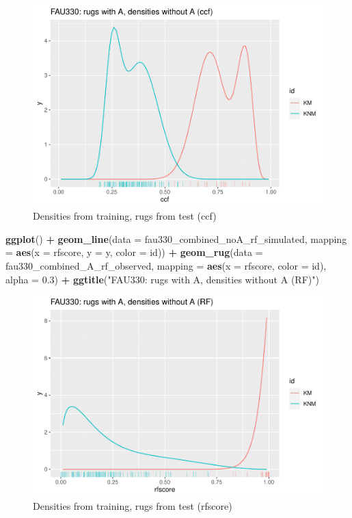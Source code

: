 \documentclass[]{elsarticle} %
\newenvironment{Shaded}{\begin{snugshade}}{\end{snugshade}}
\newcommand{\DataTypeTok}[1]{\textcolor[rgb]{0.13,0.29,0.53}{#1}}
\newcommand{\FloatTok}[1]{\textcolor[rgb]{0.00,0.00,0.81}{#1}}
\newcommand{\KeywordTok}[1]{\textcolor[rgb]{0.13,0.29,0.53}{\textbf{#1}}}
\newcommand{\NormalTok}[1]{#1}
\newcommand{\OperatorTok}[1]{\textcolor[rgb]{0.81,0.36,0.00}{\textbf{#1}}}
\newcommand{\StringTok}[1]{\textcolor[rgb]{0.31,0.60,0.02}{#1}}
\begin{document}
\begin{figure}

{\centering \includegraphics[width=0.7\linewidth]{writeup_files/figure-latex/unnamed-chunk-2-1} 

}

\caption{Densities from training, rugs from test (ccf)}\label{fig:unnamed-chunk-2}
\end{figure}

\begin{Shaded}
\begin{Highlighting}[]
\KeywordTok{ggplot}\NormalTok{() }\OperatorTok{+}\StringTok{ }
\StringTok{  }\KeywordTok{geom_line}\NormalTok{(}\DataTypeTok{data =}\NormalTok{ fau330_combined_noA_rf_simulated, }
            \DataTypeTok{mapping =} \KeywordTok{aes}\NormalTok{(}\DataTypeTok{x =}\NormalTok{ rfscore, }\DataTypeTok{y =}\NormalTok{ y, }\DataTypeTok{color =}\NormalTok{ id)) }\OperatorTok{+}\StringTok{ }
\StringTok{  }\KeywordTok{geom_rug}\NormalTok{(}\DataTypeTok{data =}\NormalTok{ fau330_combined_A_rf_observed, }
           \DataTypeTok{mapping =} \KeywordTok{aes}\NormalTok{(}\DataTypeTok{x =}\NormalTok{ rfscore, }\DataTypeTok{color =}\NormalTok{ id), }\DataTypeTok{alpha =} \FloatTok{0.3}\NormalTok{) }\OperatorTok{+}
\StringTok{  }\KeywordTok{ggtitle}\NormalTok{(}\StringTok{"FAU330: rugs with A, densities without A (RF)"}\NormalTok{)}
\end{Highlighting}
\end{Shaded}

\begin{figure}

{\centering \includegraphics[width=0.7\linewidth]{writeup_files/figure-latex/unnamed-chunk-3-1} 

}

\caption{Densities from training, rugs from test (rfscore)}\label{fig:unnamed-chunk-3}
\end{figure}
\end{document}
